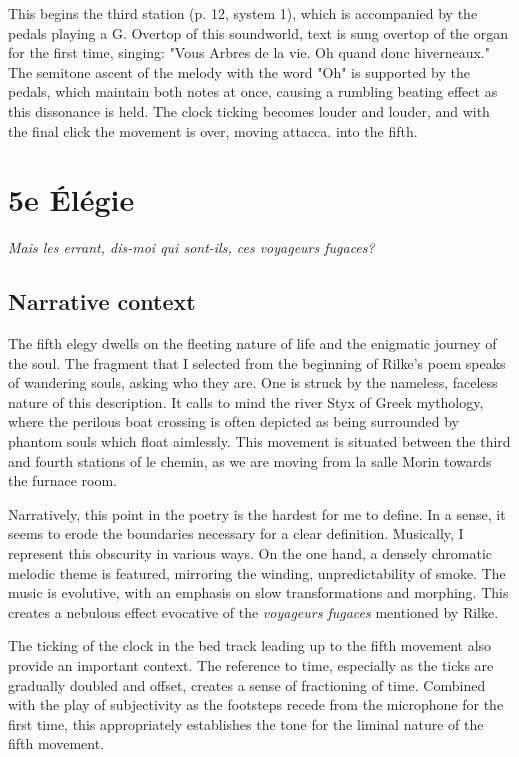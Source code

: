 \documentclass[12pt,twoside,maitrise]{dms_ks}
\theoremstyle{definition}
\begin{document}
This begins the third station (p. 12, system 1), which is accompanied by the pedals playing a G. Overtop of this soundworld, text is sung overtop of the organ for the first time, singing: "Vous Arbres de la vie. Oh quand donc hiverneaux." The semitone ascent of the melody with the word "Oh" is supported by the pedals, which maintain both notes at once, causing a rumbling beating effect as this dissonance is held. The clock ticking becomes louder and louder, and with the final click the movement is over, moving attacca. into the fifth.


\section{5e Élégie}

\epigraph{\textit{Mais les errant, dis-moi qui sont-ils, ces voyageurs fugaces?}}{}

\subsection{Narrative context}

The fifth elegy dwells on the fleeting nature of life and the enigmatic journey of the soul. The fragment that I selected from the beginning of Rilke's poem speaks of wandering souls, asking who they are. One is struck by the nameless, faceless nature of this description. It calls to mind the river Styx of Greek mythology, where the perilous boat crossing is often depicted as being surrounded by phantom souls which float aimlessly. This movement is situated between the third and fourth stations of le chemin, as we are moving from la salle Morin towards the furnace room. 

Narratively, this point in the poetry is the hardest for me to define. In a sense, it seems to erode the boundaries necessary for a clear definition. Musically, I represent this obscurity in various ways. On the one hand, a densely chromatic melodic theme is featured, mirroring the winding, unpredictability of smoke. The music is evolutive, with an emphasis on slow transformations and morphing. This creates a nebulous effect evocative of the \textit{voyageurs fugaces} mentioned by Rilke. 

The ticking of the clock in the bed track leading up to the fifth movement also provide an important context. The reference to time, especially as the ticks are gradually doubled and offset, creates a sense of fractioning of time. Combined with the play of subjectivity as the footsteps recede from the microphone for the first time, this appropriately establishes the tone for the liminal nature of the fifth movement.
\end{document}
